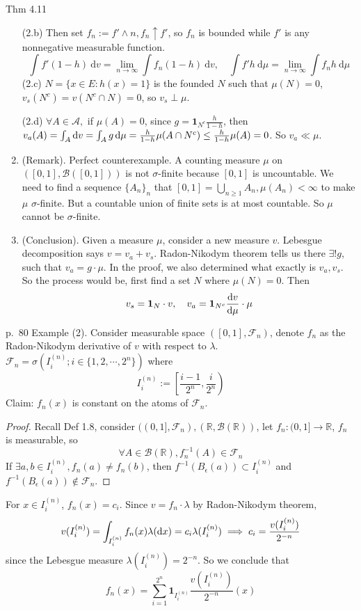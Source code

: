 \begin{note}{Thm 4.11}
\begin{enumerate}
    (2.b) Then set $f_n:= f'\land n, f_n\uparrow f'$, so $f_n$ is bounded while $f'$ is any nonnegative measurable function.
    \[
    \int f' (1-h)\mathrm{~d} v=\lim_{n\to\infty}\int f_n(1-h)\mathrm{~d} v,\quad \int f' h\mathrm{~d} \mu=\lim_{n\to\infty}\int f_nh\mathrm{~d} \mu
    \]
    (2.c) $N=\{x\in E: h(x)=1\}$ is the founded $N$ such that $\mu(N)=0$, $v_s(N^c)=v(N^c\cap N)=0$, so $v_s \perp \mu$.

    (2.d) $\forall A\in\mathcal{A}, $ if $\mu(A)=0$, since $g=\mathbf{1}_{N^c}\frac{h}{1-h}$, then $v_a(A)=\int_A\mathop{}\!\mathrm{d} v=\int_A g\mathop{}\!\mathrm{d}\mu=\frac{h}{1-h}\mu(A\cap N^c)\le \frac{h}{1-h}\mu(A)=0$. So $v_a\ll \mu$.
    \item (Remark). Perfect counterexample. A counting measure $\mu$ on $([0,1],\mathcal{B}([0,1]))$ is not $\sigma$-finite because $[0,1]$ is uncountable. We need to find a sequence $\{A_n\}_n$ that $[0,1]=\bigcup_{n\ge 1}A_n, \mu(A_n)<\infty$ to make $\mu$ $\sigma$-finite. But a countable union of finite sets is at most countable. So $\mu$ cannot be $\sigma$-finite.
    \item (Conclusion). Given a measure $\mu$, consider a new measure $v$. Lebesgue decomposition says $v=v_a+v_s$. Radon-Nikodym theorem tells us there $\exists! g$, such that $v_a=g\cdot\mu$. In the proof, we also determined what exactly is $v_a,v_s$. So the process would be, first find a set $N$ where $\mu(N)=0$. Then 
    \[
    v_s=\mathbf{1}_N\cdot v,\quad v_a=\mathbf{1}_{N^c}\frac{\mathop{}\!\mathrm{d} v}{\mathop{}\!\mathrm{d} \mu}\cdot \mu
    \]
\end{enumerate}
\end{note}

\begin{note}{p.~80}
    Example (2). Consider measurable space $([0,1], \mathcal{F}_n)$, denote $f_n$ as the Radon-Nikodym derivative of $v$ with respect to $\lambda$. $\mathcal{F}_n=\sigma\left(I_i^{(n)};i\in\{1,2,\cdots,2^n\}\right)$ where
    \[
    I_i^{(n)}:=\left[ \frac{i-1}{2^n},\frac{i}{2^n} \right)
    \]
    Claim: $f_n(x)$ is constant on the atoms of $\mathcal{F}_n$. 
    \begin{proof}
        Recall Def 1.8, consider $((0,1],\mathcal{F}_n), (\mathbb{R},\mathcal{B}(\mathbb{R}))$, let $f_n:(0,1]\to \mathbb{R}$, $f_n$ is measurable, so
        \[
        \forall A\in \mathcal{B}(\mathbb{R}), f^{-1}_n(A)\in \mathcal{F}_n
        \]
        If $\exists a,b\in I_i^{(n)}, f_n(a)\neq f_n(b)$, then $f^{-1}(B_{\epsilon}(a))\subset I^{(n)}_i$ and $f^{-1}(B_{\epsilon}(a))\notin \mathcal{F}_n$.
    \end{proof}
    For $x\in I_i^{(n)}$, $f_n(x)=c_i$. Since $v=f_n\cdot \lambda$ by Radon-Nikodym theorem, 
    \[
    v(I_i^{(n)})=\int_{I_i^{(n)}}f_n(x)\lambda(\mathop{}\!\mathrm{d} x)=c_i\lambda(I_i^{(n)})\implies c_i=\frac{v(I_i^{(n)})}{2^{-n}}
    \]
    since the Lebesgue measure $\lambda(I_i^{(n)})=2^{-n}$. So we conclude that 
    \[
    f_n(x)=\sum_{i=1}^{2^n}\mathbf{1}_{I_i^{(n)}}\frac{v(I_i^{(n)})}{2^{-n}}(x)
    \]
\end{note}